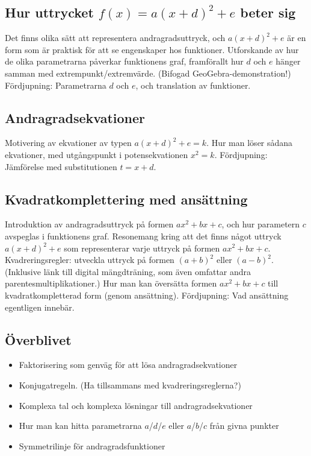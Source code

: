 \documentclass[12pt]{article}
\begin{document}
  \subsection{Hur uttrycket $f(x) = a(x+d)^2+e$ beter sig}
  Det finns olika sätt att representera andragradsuttryck, och $a(x+d)^2+e$ är en form som är praktisk för att se engenskaper hos funktioner.
  Utforskande av hur de olika parametrarna påverkar funktionens graf, framförallt hur $d$ och $e$ hänger samman med extrempunkt/extremvärde.
  (Bifogad GeoGebra-demonstration!)
  Fördjupning: Parametrarna $d$ och $e$, och translation av funktioner.
  
  \subsection{Andragradsekvationer}
  Motivering av ekvationer av typen $a(x+d)^2+e=k$.
  Hur man löser sådana ekvationer, med utgångspunkt i potensekvationen $x^2 = k$.
  Fördjupning: Jämförelse med substitutionen $t=x+d$.

  \subsection{Kvadratkomplettering med ansättning}
  Introduktion av andragradsuttryck på formen $ax^2+bx+c$, och hur parametern $c$ avspeglas i funktionens graf.
  Resonemang kring att det finns något uttryck $a(x+d)^2+e$ som representerar varje uttryck på formen $ax^2+bx+c$.
  Kvadreringsregler: utveckla uttryck på formen $(a+b)^2$ eller $(a-b)^2$.
  (Inklusive länk till digital mängdträning, som även omfattar andra parentesmultiplikationer.)
  Hur man kan översätta formen $ax^2+bx+c$ till kvadratkompletterad form (genom ansättning).
  Fördjupning: Vad ansättning egentligen innebär.
  
  \subsection{Överblivet}
  \begin{itemize}
    \item Faktorisering som genväg för att lösa andragradsekvationer
    \item Konjugatregeln. (Ha tillsammans med kvadreringsreglerna?)
    \item Komplexa tal och komplexa lösningar till andragradsekvationer
    \item Hur man kan hitta parametrarna $a$/$d$/$e$ eller $a$/$b$/$c$ från givna punkter
    \item Symmetrilinje för andragradsfunktioner
  \end{itemize}
  
\end{document}
